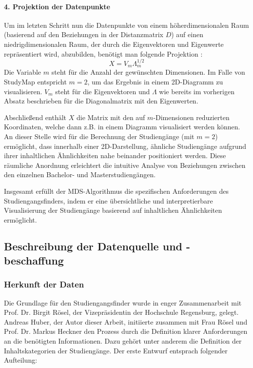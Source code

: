 \paragraph*{4. Projektion der Datenpunkte}
Um im letzten Schritt nun die Datenpunkte von einem höherdimensionalen Raum (basierend auf den
Beziehungen in der Distanzmatrix $ D $) auf einen niedrigdimensionalen Raum,
der durch die Eigenvektoren und Eigenwerte repräsentiert wird, abzubilden,
benötigt man folgende Projektion \parencite{he_classical_2018}:
$$ X = V_m \Lambda^{1/2}_m $$
Die Variable $ m $ steht für die Anzahl der gewünschten Dimensionen. Im Falle
von StudyMap entspricht $ m = 2 $, um das Ergebnis in einem 2D-Diagramm zu
visualisieren. $ V_{m} $ steht für die Eigenvektoren und $ \Lambda $ wie bereits
im vorherigen Absatz beschrieben für die Diagonalmatrix mit den Eigenwerten.
\parencite{wickelmaier_introduction_2003}

Abschließend enthält $ X $ die Matrix mit den auf $ m $-Dimensionen reduzierten
Koordinaten, welche dann z.B. in einem Diagramm visualisiert werden können.
An dieser Stelle wird für die Berechnung der Studiengänge (mit $ m = 2 $)
ermöglicht, dass innerhalb einer 2D-Darstellung, ähnliche Studiengänge aufgrund
ihrer inhaltlichen Ähnlichkeiten nahe beinander positioniert werden. Diese
räumliche Anordnung erleichtert die intuitive Analyse von Beziehungen zwischen
den einzelnen Bachelor- und Masterstudiengängen.

Insgesamt erfüllt der MDS-Algorithmus die spezifischen Anforderungen des
Studiengangsfinders, indem er eine übersichtliche und interpretierbare
Visualisierung der Studiengänge basierend auf inhaltlichen Ähnlichkeiten
ermöglicht.

\subsection{Beschreibung der Datenquelle und -beschaffung}\label{sec:datenquelle}
\subsubsection{Herkunft der Daten}\label{sec:herkunft-der-daten}
Die Grundlage für den Studiengangsfinder wurde in enger Zusammenarbeit mit Prof. Dr. Birgit Rösel, der Vizepräsidentin der Hochschule Regensburg, gelegt. Andreas Huber, der Autor dieser Arbeit, initiierte zusammen mit Frau Rösel und Prof. Dr. Markus Heckner den Prozess durch die Definition klarer Anforderungen an die benötigten Informationen. Dazu gehört unter anderem die Definition der Inhaltskategorien der Studiengänge. Der erste Entwurf entsprach folgender Aufteilung:

